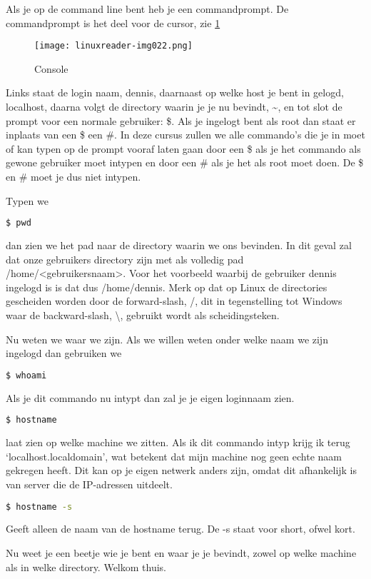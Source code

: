 Als je op de command line bent heb je een commandprompt. De commandprompt is het deel voor de cursor, zie \ref{fig:console}

\begin{figure}[h]
\texttt{[image: linuxreader-img022.png]}
	\label{fig:console}
	\caption{Console}
\end{figure}

Links staat de login naam, dennis, daarnaast op welke host je bent in gelogd, localhost, daarna volgt de directory
waarin je je nu bevindt, \~{}, en tot slot de prompt voor een normale gebruiker: \$. Als je ingelogt bent als root dan staat er inplaats van een \$ een \#. In deze cursus zullen we alle commando's die je in moet of kan typen op de prompt vooraf laten gaan door een \$ als je het commando als gewone gebruiker moet intypen en door een \# als je het als root moet doen. De \$ en \# moet je dus niet intypen.

Typen we
\begin{lstlisting}[language=bash]
$ pwd
\end{lstlisting}
dan zien we het pad naar de directory waarin we ons bevinden. In dit geval zal dat onze gebruikers
directory zijn met als volledig pad /home/{\textless}gebruikersnaam{\textgreater}. Voor het voorbeeld waarbij de
gebruiker dennis ingelogd is is dat dus /home/dennis. Merk op dat op Linux de directories gescheiden worden door de
forward-slash, /, dit in tegenstelling tot Windows waar de backward-slash, {\textbackslash}, gebruikt wordt als
scheidingsteken.

Nu weten we waar we zijn. Als we willen weten onder welke naam we zijn ingelogd dan gebruiken we
\begin{lstlisting}[language=bash]
$ whoami
\end{lstlisting}
Als je dit commando nu intypt dan zal je je eigen loginnaam zien.

\begin{lstlisting}[language=bash]
$ hostname
\end{lstlisting}
laat zien op welke machine we zitten. Als ik dit commando intyp krijg ik terug `localhost.localdomain', wat
betekent dat mijn machine nog geen echte naam gekregen heeft. Dit kan op je eigen netwerk anders zijn, omdat dit
afhankelijk is van server die de IP-adressen uitdeelt.

\begin{lstlisting}[language=bash]
$ hostname -s
\end{lstlisting}
Geeft alleen de naam van de hostname terug. De -s staat voor short, ofwel kort.

Nu weet je een beetje wie je bent en waar je je bevindt, zowel op welke machine als in welke directory. Welkom thuis.

